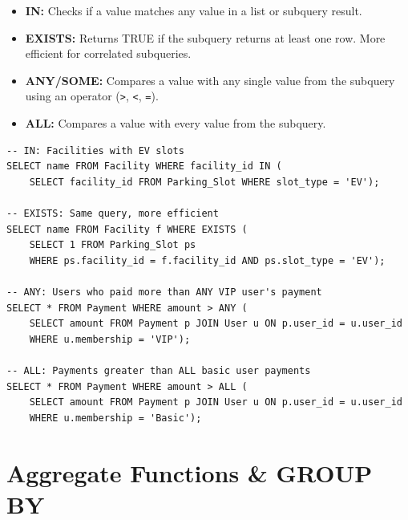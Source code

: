 \documentclass[12pt,a4paper]{article}
\begin{document}
\begin{questionbox}
\end{questionbox}
\begin{answerbox}
\begin{itemize}[nosep]
    \item \textbf{IN:} Checks if a value matches any value in a list or subquery result.
    \item \textbf{EXISTS:} Returns TRUE if the subquery returns at least one row. More efficient for correlated subqueries.
    \item \textbf{ANY/SOME:} Compares a value with any single value from the subquery using an operator (\texttt{>}, \texttt{<}, \texttt{=}).
    \item \textbf{ALL:} Compares a value with every value from the subquery.
\end{itemize}
\begin{lstlisting}
-- IN: Facilities with EV slots
SELECT name FROM Facility WHERE facility_id IN (
    SELECT facility_id FROM Parking_Slot WHERE slot_type = 'EV');

-- EXISTS: Same query, more efficient
SELECT name FROM Facility f WHERE EXISTS (
    SELECT 1 FROM Parking_Slot ps
    WHERE ps.facility_id = f.facility_id AND ps.slot_type = 'EV');

-- ANY: Users who paid more than ANY VIP user's payment
SELECT * FROM Payment WHERE amount > ANY (
    SELECT amount FROM Payment p JOIN User u ON p.user_id = u.user_id
    WHERE u.membership = 'VIP');

-- ALL: Payments greater than ALL basic user payments
SELECT * FROM Payment WHERE amount > ALL (
    SELECT amount FROM Payment p JOIN User u ON p.user_id = u.user_id
    WHERE u.membership = 'Basic');
\end{lstlisting}
\end{answerbox}

\section{Aggregate Functions \& GROUP BY}
\end{document}

